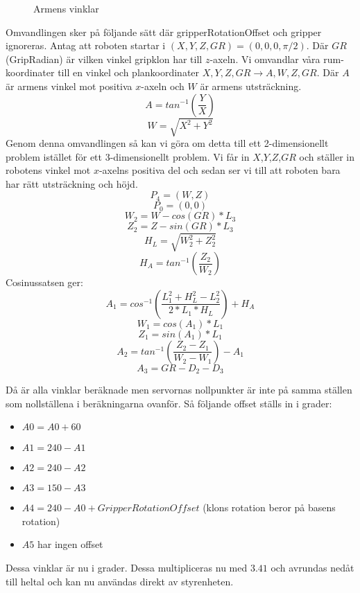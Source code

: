 \begin{figure}[h!]
	\centerline{}
	\caption{Armens vinklar}
\end{figure}

Omvandlingen sker på följande sätt där gripperRotationOffset och gripper ignoreras. Antag att roboten startar i $(X,Y,Z,GR)=(0,0,0,\pi/2)$.
Där $GR$(GripRadian) är vilken vinkel gripklon har till $z$-axeln.\newline
Vi omvandlar våra rum-koordinater till en vinkel och plankoordinater $X,Y,Z,GR\rightarrow A,W,Z,GR$. Där $A$ är armens vinkel mot positiva $x$-axeln och $W$ är armens utsträckning.
$$A=tan^{-1}(\dfrac{Y}{X}) $$
$$W=\sqrt{X^2+Y^2}$$
Genom denna omvandlingen så kan vi göra om detta till ett 2-dimensionellt problem istället för ett 3-dimensionellt problem. Vi får in $X$,$Y$,$Z$,$GR$ och ställer in robotens vinkel mot $x$-axelns positiva del och sedan ser vi till att roboten bara har rätt utsträckning och höjd.
$$P_4=(W,Z)$$
$$P_0=(0,0)$$
$$W_2=W-cos(GR)*L_3$$
$$Z_2=Z-sin(GR)*L_3$$
$$H_L=\sqrt{W_2^2+Z_2^2}$$
$$H_A=tan^{-1}(\dfrac{Z_2}{W_2})$$
Cosinussatsen ger:
$$A_1=cos^{-1}(\dfrac{L_1^2+H_L^2-L_2^2}{2*L_1*H_L})+H_A$$
$$W_1=cos(A_1)*L_1$$
$$Z_1=sin(A_1)*L_1$$
$$A_2=tan^{-1}(\dfrac{Z_2-Z_1}{W_2-W_1})-A_1$$
$$A_3=GR-D_2-D_3$$

Då är alla vinklar beräknade men servornas nollpunkter är inte på samma ställen som nollställena i beräkningarna ovanför. Så följande offset ställs in i grader:
\begin{itemize}
	\item $A0=A0+60$
	\item $A1=240-A1$
	\item $A2=240-A2$
	\item $A3=150-A3$
	\item $A4=240-A0+GripperRotationOffset$ (klons rotation beror på basens rotation)
	\item $A5$ har ingen offset
\end{itemize}
Dessa vinklar är nu i grader. Dessa multipliceras nu med $3.41$  och avrundas nedåt till heltal och kan nu användas direkt av styrenheten.
